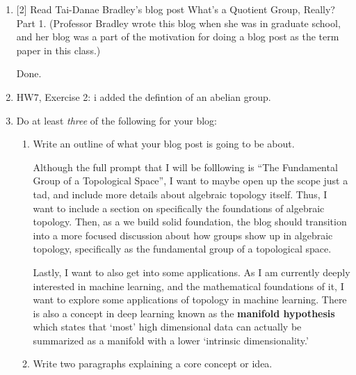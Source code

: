 \documentclass{article}
\begin{document}
\begin{enumerate}
    \item {
        [2] Read Tai-Danae Bradley's blog post What's a Quotient Group, Really? Part 1. (Professor Bradley wrote this blog when she was in graduate school, and her blog was a part of the motivation for doing a blog post as the term paper in this class.)

        Done.
    }
    \item {
        HW7, Exercise 2: i added the defintion of an abelian group.
    }

    \item {
        Do at least \emph{three} of the following for your blog:

        \begin{enumerate}
            \item[a] {
                Write an outline of what your blog post is going to be about.

                Although the full prompt that I will be folllowing is ``The 
                Fundamental Group of a Topological Space'', I want to maybe open 
                up the scope just a tad, and include more details about algebraic 
                topology itself. Thus, I want to include a section on specifically 
                the foundations of algebraic topology. Then, as a we build solid 
                foundation, the blog should transition into a more focused discussion 
                about how groups show up in algebraic topology, specifically as 
                the fundamental group of a topological space.

                Lastly, I want to also get into some applications. As I am 
                currently deeply interested in machine learning, and the 
                mathematical foundations of it, I want to explore some applications 
                of topology in machine learning. There is also a concept in 
                deep learning known as the \textbf{manifold hypothesis} which 
                states that `most' high dimensional data can actually be summarized 
                as a manifold with a lower `intrinsic dimensionality.'
            }
            \item[b] {
                Write two paragraphs explaining a core concept or idea.

}
\end{enumerate}}
\end{enumerate}
\end{document}
